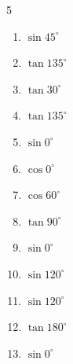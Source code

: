 \begin{multicols}{5}
\begin{enumerate}
  \item $\displaystyle \sin{45^\circ}$


  \item $\displaystyle \tan{135^\circ}$

        \phantom{$\displaystyle =-1$}

  \item $\displaystyle \tan{30^\circ}$


  \item $\displaystyle \tan{135^\circ}$

        \phantom{$\displaystyle =-1$}

  \item $\displaystyle \sin{0^\circ}$

        \phantom{$\displaystyle =0$}

  \item $\displaystyle \cos{0^\circ}$

        \phantom{$\displaystyle =1$}

  \item $\displaystyle \cos{60^\circ}$


  \item $\displaystyle \tan{90^\circ}$

        \phantom{$\displaystyle なし$}

  \item $\displaystyle \sin{0^\circ}$

        \phantom{$\displaystyle =0$}

  \item $\displaystyle \sin{120^\circ}$


\columnbreak %

  \item $\displaystyle \sin{120^\circ}$


  \item $\displaystyle \tan{180^\circ}$

        \phantom{$\displaystyle =0$}

  \item $\displaystyle \sin{0^\circ}$


\end{enumerate}
\end{multicols}
